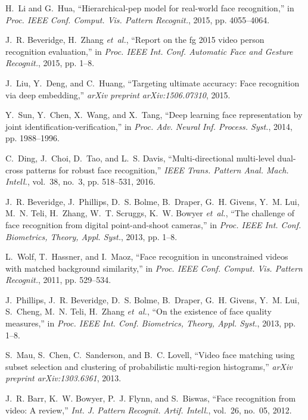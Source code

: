 \documentclass[10pt,journal,cspaper,compsoc]{IEEEtran}
\begin{document}
\begin{thebibliography}{10}
H.~Li and G.~Hua, ``Hierarchical-pep model for real-world face recognition,''
  in \emph{Proc. IEEE Conf. Comput. Vis. Pattern Recognit.}, 2015, pp.
  4055--4064.

J.~R. Beveridge, H.~Zhang \emph{et~al.}, ``Report on the fg 2015 video person
  recognition evaluation,'' in \emph{Proc. IEEE Int. Conf. Automatic Face and
  Gesture Recognit.}, 2015, pp. 1--8.

J.~Liu, Y.~Deng, and C.~Huang, ``Targeting ultimate accuracy: Face recognition
  via deep embedding,'' \emph{arXiv preprint arXiv:1506.07310}, 2015.

Y.~Sun, Y.~Chen, X.~Wang, and X.~Tang, ``Deep learning face representation by
  joint identification-verification,'' in \emph{Proc. Adv. Neural Inf. Process.
  Syst.}, 2014, pp. 1988--1996.

C.~Ding, J.~Choi, D.~Tao, and L.~S. Davis, ``Multi-directional multi-level
  dual-cross patterns for robust face recognition,'' \emph{IEEE Trans. Pattern
  Anal. Mach. Intell.}, vol.~38, no.~3, pp. 518--531, 2016.

J.~R. Beveridge, J.~Phillips, D.~S. Bolme, B.~Draper, G.~H. Givens, Y.~M. Lui,
  M.~N. Teli, H.~Zhang, W.~T. Scruggs, K.~W. Bowyer \emph{et~al.}, ``The
  challenge of face recognition from digital point-and-shoot cameras,'' in
  \emph{Proc. IEEE Int. Conf. Biometrics, Theory, Appl. Syst.}, 2013, pp. 1--8.

L.~Wolf, T.~Hassner, and I.~Maoz, ``Face recognition in unconstrained videos
  with matched background similarity,'' in \emph{Proc. IEEE Conf. Comput. Vis.
  Pattern Recognit.}, 2011, pp. 529--534.

J.~Phillips, J.~R. Beveridge, D.~S. Bolme, B.~Draper, G.~H. Givens, Y.~M. Lui,
  S.~Cheng, M.~N. Teli, H.~Zhang \emph{et~al.}, ``On the existence of face
  quality measures,'' in \emph{Proc. IEEE Int. Conf. Biometrics, Theory, Appl.
  Syst.}, 2013, pp. 1--8.

S.~Mau, S.~Chen, C.~Sanderson, and B.~C. Lovell, ``Video face matching using
  subset selection and clustering of probabilistic multi-region histograms,''
  \emph{arXiv preprint arXiv:1303.6361}, 2013.

J.~R. Barr, K.~W. Bowyer, P.~J. Flynn, and S.~Biswas, ``Face recognition from
  video: A review,'' \emph{Int. J. Pattern Recognit. Artif. Intell.}, vol.~26,
  no.~05, 2012.


\end{thebibliography}
\end{document}
